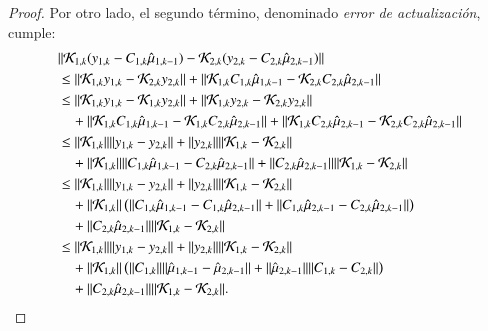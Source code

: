 \begin{proof}
Por otro lado, el segundo término, denominado \textit{error de actualización}, cumple:
\begin{equation*}
	\begin{aligned}
		& \|  \mathcal{K}_{1,k} (y_{1,k} - C_{1,k} \hat\mu_{1,k-1}) -  \mathcal{K}_{2,k} (y_{2,k} - C_{2,k} \hat\mu_{2,k-1})  \| \\
		& \leq  \| \mathcal{K}_{1,k} y_{1,k} -  \mathcal{K}_{2,k} y_{2,k}  \| + \| \mathcal{K}_{1,k} C_{1,k} \hat\mu_{1,k-1} - \mathcal{K}_{2,k} C_{2,k} \hat\mu_{2,k-1}  \| \\
		& \leq \| \mathcal{K}_{1,k} y_{1,k} -  \mathcal{K}_{1,k} y_{2,k}  \| + \| \mathcal{K}_{1,k} y_{2,k} -  \mathcal{K}_{2,k} y_{2,k}  \| \\
		& \quad + \| \mathcal{K}_{1,k} C_{1,k} \hat\mu_{1,k-1} - \mathcal{K}_{1,k} C_{2,k} \hat\mu_{2,k-1}  \| + \| \mathcal{K}_{1,k} C_{2,k} \hat\mu_{2,k-1} - \mathcal{K}_{2,k} C_{2,k} \hat\mu_{2,k-1}  \| \\
		& \leq \| \mathcal{K}_{1,k} \| \|  y_{1,k} - y_{2,k}  \| + \| y_{2,k} \| \| \mathcal{K}_{1,k}  -  \mathcal{K}_{2,k}  \| \\
		& \quad + \| \mathcal{K}_{1,k} \| \|  C_{1,k} \hat\mu_{1,k-1} - C_{2,k} \hat\mu_{2,k-1}  \| + \| C_{2,k} \hat\mu_{2,k-1} \| \| \mathcal{K}_{1,k}  - \mathcal{K}_{2,k} \| \\
		& \leq \| \mathcal{K}_{1,k} \| \|  y_{1,k} - y_{2,k}  \| + \| y_{2,k} \| \| \mathcal{K}_{1,k}  -  \mathcal{K}_{2,k}  \| \\
		& \quad + \| \mathcal{K}_{1,k} \| \left ( \|  C_{1,k} \hat\mu_{1,k-1} - C_{1,k} \hat\mu_{2,k-1}  \| + \|  C_{1,k} \hat\mu_{2,k-1} - C_{2,k} \hat\mu_{2,k-1}  \| \right ) \\
		& \quad + \| C_{2,k} \hat\mu_{2,k-1} \| \| \mathcal{K}_{1,k}  - \mathcal{K}_{2,k} \| \\
		& \leq \| \mathcal{K}_{1,k} \| \|  y_{1,k} - y_{2,k}  \| + \| y_{2,k} \| \| \mathcal{K}_{1,k}  -  \mathcal{K}_{2,k}  \| \\
		& \quad + \| \mathcal{K}_{1,k} \| \left ( \| C_{1,k}  \| \|  \hat\mu_{1,k-1} - \hat\mu_{2,k-1}  \| + \| \hat\mu_{2,k-1}  \| \| C_{1,k} - C_{2,k}  \| \right ) \\
		& \quad + \| C_{2,k} \hat\mu_{2,k-1} \| \| \mathcal{K}_{1,k}  - \mathcal{K}_{2,k} \|.
	\end{aligned}		
\end{equation*}


\end{proof}
